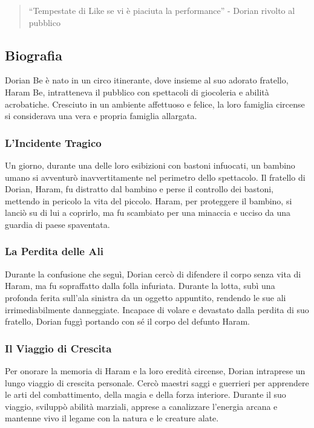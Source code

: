 \begin{quote}
``Tempestate di Like se vi è piaciuta la performance'' - Dorian rivolto
al pubblico
\end{quote}

\subsection{Biografia}\label{biografia}


Dorian Be è nato in un circo itinerante, dove insieme al suo adorato
fratello, Haram Be, intratteneva il pubblico con spettacoli di
giocoleria e abilità acrobatiche. Cresciuto in un ambiente affettuoso e
felice, la loro famiglia circense si considerava una vera e propria
famiglia allargata.

\subsubsection{L'Incidente Tragico}
Un giorno, durante una delle loro esibizioni con bastoni infuocati, un
bambino umano si avventurò inavvertitamente nel perimetro dello
spettacolo. Il fratello di Dorian, Haram, fu distratto dal bambino e
perse il controllo dei bastoni, mettendo in pericolo la vita del
piccolo. Haram, per proteggere il bambino, si lanciò su di lui a
coprirlo, ma fu scambiato per una minaccia e ucciso da una guardia di
paese spaventata.

\subsubsection{La Perdita delle Ali}
Durante la confusione che seguì, Dorian cercò di difendere il corpo
senza vita di Haram, ma fu sopraffatto dalla folla infuriata. Durante la
lotta, subì una profonda ferita sull'ala sinistra da un oggetto
appuntito, rendendo le sue ali irrimediabilmente danneggiate. Incapace
di volare e devastato dalla perdita di suo fratello, Dorian fuggì
portando con sé il corpo del defunto Haram.

\subsubsection{Il Viaggio di Crescita}
Per onorare la memoria di Haram e la loro eredità circense, Dorian
intraprese un lungo viaggio di crescita personale. Cercò maestri saggi e
guerrieri per apprendere le arti del combattimento, della magia e della
forza interiore. Durante il suo viaggio, sviluppò abilità marziali,
apprese a canalizzare l'energia arcana e mantenne vivo il legame con la
natura e le creature alate.

